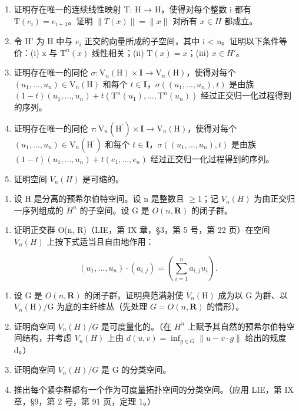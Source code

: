 \begin{enumerate}
\def\labelenumi{\alph{enumi})}
\item
  证明存在唯一的连续线性映射 T: H → H，使得对每个整数 i 都有 \(\mathrm{T}(e_{i}) = e_{i+1}\)。证明 \(\|T(x)\| = \|x\|\) 对所有 \(x \in H\) 都成立。
\item
  令 H' 为 H 中与 \(e_{i}\) 正交的向量所成的子空间，其中 i \textless{} n。证明以下条件等价：(i) x 与 \(\mathrm{T}^{n}(x)\) 线性相关；(ii) \(\mathrm{T}(x) = x\)；(iii) \(x \in H'\)。
\item
  证明存在唯一的同伦 \(\sigma\colon\mathrm{V}_{n}(\mathrm{H})\times\mathbf{I}\to\mathrm{V}_{n}(\mathrm{H})\)，使得对每个 \((u_{1},\ldots,u_{n})\in\mathrm{V}_{n}(\mathrm{H})\) 和每个 \(t\in\mathbf{I}\)，\(\sigma((u_{1},\ldots,u_{n}),t)\) 是由族 \((1-t)(u_{1},\ldots,u_{n})+t(\mathrm{T}^{n}(u_{1}),\ldots,\mathrm{T}^{n}(u_{n}))\) 经过正交归一化过程得到的序列。
\item
  证明存在唯一的同伦 \(\tau\colon\mathrm{V}_{n}(\mathrm{H}^{\prime})\times\mathbf{I}\to\mathrm{V}_{n}(\mathrm{H})\)，使得对每个 \((u_{1},\ldots,u_{n})\in\mathrm{V}_{n}(\mathrm{H}^{\prime})\) 和每个 \(t\in\mathbf{I}\)，\(\sigma((u_{1},\ldots,u_{n}),t)\) 是由族 \((1-t)(u_{1},\ldots,u_{n})+t(e_{1},\ldots,e_{n})\) 经过正交归一化过程得到的序列。
\item
  证明空间 \(V_{n}(H)\) 是可缩的。
\end{enumerate}

\begin{enumerate}
\def\labelenumi{\arabic{enumi})}
\setcounter{enumi}{2}
\tightlist
\item
  设 H 是分离的预希尔伯特空间。设 n 是整数且 \(\geqslant 1\)；记 \(V_{n}(H)\) 为由正交归一序列组成的 \(H^{n}\) 的子空间。设 G 是 \(O(n, \mathbf{R})\) 的闭子群。
\end{enumerate}

\begin{enumerate}
\def\labelenumi{\alph{enumi})}
\tightlist
\item
   证明正交群 O(n, R)（LIE，第 IX 章，§3，第 5 号，第 22 页）在空间 \(V_{n}(H)\) 上按下式适当且自由地作用：
\end{enumerate}

\[
(u _ {1}, \dots , u _ {n}) \cdot (a _ {i, j}) = \left(\sum_ {i = 1} ^ {n} a _ {i, j} u _ {i}\right).
\]

\begin{enumerate}
\def\labelenumi{\alph{enumi})}
\setcounter{enumi}{1}
\item
  设 G 是 \(O(n,\mathbf{R})\) 的闭子群。证明典范满射使 \(V_{n}(\mathrm{H})\) 成为以 G 为群、以 \(V_{n}(\mathrm{H})/\mathrm{G}\) 为底的主纤维丛（先处理 \(G = O(n,\mathbf{R})\) 的情形）。
\item
  证明商空间 \(V_{n}(H)/G\) 是可度量化的。（在 \(H^{n}\) 上赋予其自然的预希尔伯特空间结构，并考虑 \(V_{n}(H)\) 上由 \(d(u,v)=\inf_{g\in G}\|u-v\cdot g\|\) 给出的规度 d。）
\item
  证明商空间 \(V_{n}(H)/G\) 是 G 的分类空间。
\item
  推出每个紧李群都有一个作为可度量拓扑空间的分类空间。（应用 LIE，第 IX 章，§9，第 2 号，第 91 页，定理 1。）
\end{enumerate}

